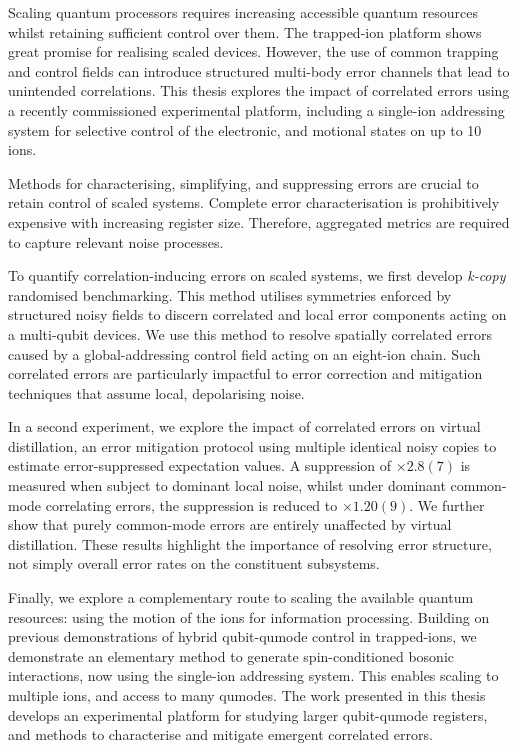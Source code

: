 Scaling quantum processors requires increasing accessible quantum resources whilst retaining sufficient control over them. 
%
The trapped-ion platform shows great promise for realising scaled devices. However, the use of common trapping and control fields can introduce structured multi-body error channels that lead to unintended correlations. 
%
This thesis explores the impact of correlated errors using a recently commissioned experimental platform, including a single-ion addressing system for selective control of the electronic, and motional states on up to 10 ions.

Methods for characterising, simplifying, and suppressing errors are crucial to retain control of scaled systems. 
%
Complete error characterisation is prohibitively expensive with increasing register size. Therefore, aggregated metrics are required to capture relevant noise processes.

To quantify correlation-inducing errors on scaled systems, we first develop \emph{k-copy} randomised benchmarking. This method utilises symmetries enforced by structured noisy fields to discern correlated and local error components acting on a multi-qubit devices.
%
We use this method to resolve spatially correlated errors caused by a global-addressing control field acting on an eight-ion chain.
%
Such correlated errors are particularly impactful to error correction and mitigation techniques that assume local, depolarising noise.

In a second experiment, we explore the impact of correlated errors on virtual distillation, an error mitigation protocol using multiple identical noisy copies to estimate error-suppressed expectation values. A suppression of $\times2.8(7)$ is measured when subject to dominant local noise, whilst under dominant common-mode correlating errors, the suppression is reduced to $\times1.20(9)$. We further show that purely common-mode errors are entirely unaffected by virtual distillation.
%
These results highlight the importance of resolving error structure, not simply overall error rates on the constituent subsystems. 

Finally, we explore a complementary route to scaling the available quantum resources: using the motion of the ions for information processing. 
%
Building on previous demonstrations of hybrid qubit-qumode control in trapped-ions, we demonstrate an elementary method to generate spin-conditioned bosonic interactions, now using the single-ion addressing system. This enables scaling to multiple ions, and access to many qumodes.
%
The work presented in this thesis develops an experimental platform for studying larger qubit-qumode registers, and methods to characterise and mitigate emergent correlated errors.